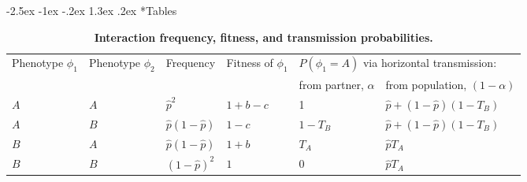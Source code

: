 \documentclass[12pt]{extarticle}
\makeatletter
\renewcommand\section{\@startsection {section}{1}{\z@}%
     {-2.5ex \@plus -1ex \@minus -.2ex}%
     {1.3ex \@plus.2ex}%
    {\Large\bfseries}}
\makeatother
\begin{document}
{\begin{appendices}
  
\end{appendices}







\newpage


\section*{Tables}


 
\bigskip
\begin{table}[h]
\caption{\textbf{Interaction frequency, fitness, and transmission probabilities.}}
\begin{tabular}{@{}llllll@{}}
\toprule
\multirow{2}{*}{Phenotype $\phi_1$} &
  \multirow{2}{*}{Phenotype $\phi_2$} &
  \multirow{2}{*}{Frequency} &
  \multirow{2}{*}{Fitness of $\phi_1$} &
  \multicolumn{2}{l}{$P(\phi_1=A)$ via horizontal transmission:} \\ \cmidrule(l){5-6} 
    &     &                      &         & from partner, $\alpha$ & from population, $(1-\alpha)$ \\ \cmidrule(r){1-6}
$A$ & $A$ & $\hat{p}^2$          & $1+b-c$ & 1                      & $\hat{p}+(1-\hat{p})(1-T_B)$  \\
$A$ & $B$ & $\hat{p}(1-\hat{p})$ & $1-c$   & $1-T_B$                & $\hat{p}+(1-\hat{p})(1-T_B)$  \\
$B$ & $A$ & $\hat{p}(1-\hat{p})$ & $1+b$   & $T_A$                  & $\hat{p} T_A$                 \\
$B$ & $B$ & $(1-\hat{p})^2$      & $1$     & $0$                    & $\hat{p} T_A$                 \\ \bottomrule
\end{tabular}
\label{table:interactions}
\end{table}
\bigskip


}
\end{document}
